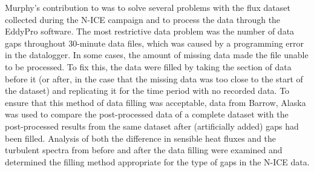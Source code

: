 Murphy's contribution to \cite{walden:2017} was to solve several problems with the flux dataset collected during the N-ICE campaign and to process the data through the EddyPro software. The most restrictive data problem was the number of data gaps throughout 30-minute data files, which was caused by a programming error in the datalogger. In some cases, the amount of missing data made the file unable to be processed. To fix this, the data were filled by taking the section of data before it (or after, in the case that the missing data was too close to the start of the dataset) and replicating it for the time period with no recorded data. To ensure that this method of data filling was acceptable, data from Barrow, Alaska was used to compare the post-processed data of a complete dataset with the post-processed results from the same dataset after (artificially added) gaps had been filled. Analysis of both the difference in sensible heat fluxes and the turbulent spectra from before and after the data filling were examined and determined the filling method appropriate for the type of gaps in the N-ICE data. 